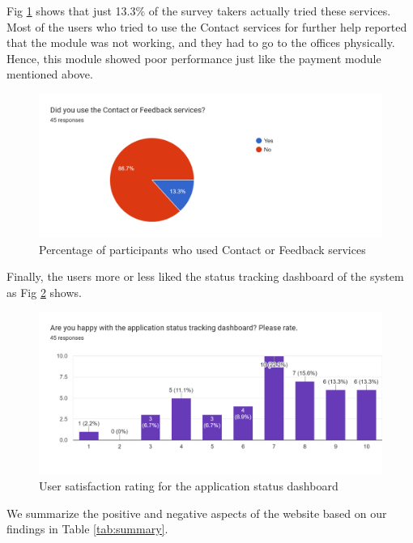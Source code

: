 Fig \ref{fig:contact} shows that just 13.3\% of the survey takers actually tried these services. Most of the users who tried to use the Contact services for further help reported that the module was not working, and they had to go to the offices physically. Hence, this module showed poor performance just like the payment module mentioned above.
\newline
\begin{figure}[ht]
\centering
\centerline{\includegraphics[width=\linewidth]{Figures/contact.png}}
\vspace{-10pt}\caption{Percentage of participants who used Contact or Feedback services}
\label{fig:contact}
\end{figure}

Finally, the users more or less liked the status tracking dashboard of the system as Fig \ref{fig:dash} shows.

\begin{figure}[ht]
\centering
\centerline{\includegraphics[width=\linewidth]{Figures/dashboard.png}}
\vspace{-10pt}\caption{User satisfaction rating for the application status dashboard}
\label{fig:dash}
\end{figure}

We summarize the positive and negative aspects of the website based on our findings in Table \ref{tab:summary}.

